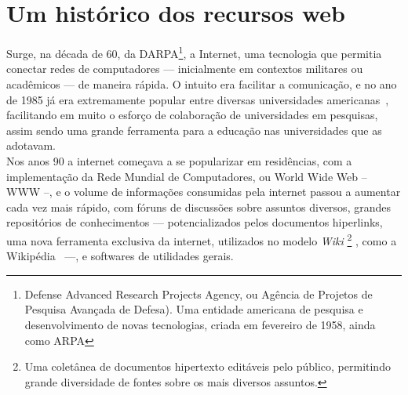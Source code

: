 \chapter{Um histórico dos recursos web}
\label{cap:historicoWeb}



Surge, na década de 60, da DARPA\footnote{Defense Advanced Research Projects Agency, ou Agência de Projetos de Pesquisa Avançada de Defesa). Uma entidade americana de pesquisa e desenvolvimento de novas tecnologias, criada em fevereiro de 1958, ainda como ARPA}, a Internet, uma tecnologia que permitia conectar redes de computadores --- inicialmente em contextos militares ou acadêmicos --- de maneira rápida. O intuito era facilitar a comunicação, e no ano de 1985 já era extremamente popular entre diversas universidades americanas~\cite{internetleiner2009brief}, facilitando em muito o esforço de colaboração de universidades em pesquisas, assim sendo uma grande ferramenta para a educação nas universidades que as adotavam.
\\

Nos anos 90 a internet começava a se popularizar em residências, com a implementação da Rede Mundial de Computadores, ou World Wide Web -- WWW --, e o volume de informações consumidas pela internet passou a aumentar cada vez mais rápido, com fóruns de discussões sobre assuntos diversos, grandes repositórios de conhecimentos --- potencializados pelos documentos hiperlinks, uma nova ferramenta exclusiva da internet, utilizados no modelo \textit{Wiki}
\footnote{Uma coletânea de documentos hipertexto editáveis pelo público, permitindo grande diversidade de fontes sobre os mais diversos assuntos.}
, como a Wikipédia~\cite{wikivoss2005measuring} ---, e softwares de utilidades gerais. 

